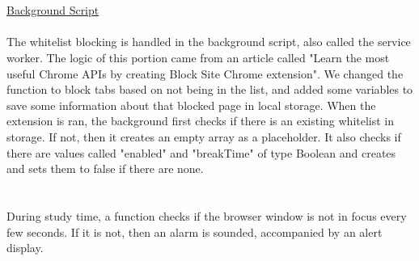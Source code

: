 \documentclass[12pt]{article}
\begin{document}
\\\\
\noindent \underline{Background Script}\\\\
\indent The whitelist blocking is handled in the background script, also called the service worker. The logic of this portion came from an article called "Learn the most useful Chrome APIs by creating Block Site Chrome extension". We changed the function to block tabs based on not being in the list, and added some variables to save some information about that blocked page in local storage.
When the extension is ran, the background first checks if there is an existing whitelist in storage. If not, then it creates an empty array as a placeholder.
It also checks if there are values called "enabled" and "breakTime" of type Boolean and creates and sets them to false if there are none.\\
\\\\
During study time, a function checks if the browser window is not in focus every few seconds. If it is not, then an alarm is sounded, accompanied by an alert display.
\end{document}
